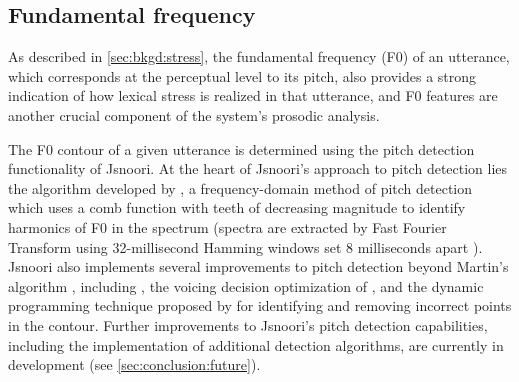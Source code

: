 	\subsection{Fundamental frequency}
	\label{sec:prosody:f0}
	
	
	As described in \cref{sec:bkgd:stress}, the fundamental frequency (F0) of an utterance, which corresponds at the perceptual level to its pitch, also provides a strong indication of how lexical stress is realized in that utterance, and F0 features 
	are another crucial component of
	the system's prosodic analysis. 
	
	
	The F0 contour of a given utterance is determined using the pitch detection 
	functionality of 
	Jsnoori. At the heart of Jsnoori's approach to pitch detection lies the algorithm developed by \textcite{Martin1982}, a frequency-domain method of pitch detection which uses a comb function with teeth of decreasing magnitude to identify harmonics of F0 in the spectrum (spectra are extracted by Fast Fourier Transform using 32-millisecond Hamming windows set 8 milliseconds apart ). Jsnoori also implements several improvements to pitch detection beyond Martin's algorithm \citep{DiMartino1999}, including , the voicing decision optimization of   \textcite{Secrest1983}, and the dynamic programming technique proposed by \textcite{Ney1981} for identifying and removing incorrect points in the contour. Further improvements to Jsnoori's pitch detection capabilities, including the implementation of additional detection algorithms, are currently in development (see \cref{sec:conclusion:future}).
	
